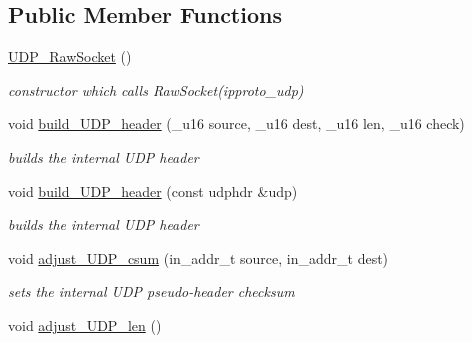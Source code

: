 \subsection*{Public Member Functions}
\begin{CompactItemize}
\item 
\hypertarget{classsocketpp_1_1UDP__RawSocket_508aba470eee4010ca16007823c91650}{
\hyperlink{classsocketpp_1_1UDP__RawSocket_508aba470eee4010ca16007823c91650}{UDP\_\-RawSocket} ()}
\label{classsocketpp_1_1UDP__RawSocket_508aba470eee4010ca16007823c91650}

\begin{CompactList}\small\item\em constructor which calls RawSocket(ipproto\_\-udp) \item\end{CompactList}\item 
void \hyperlink{classsocketpp_1_1UDP__RawSocket_f107901141295d21929008e281aac00f}{build\_\-UDP\_\-header} (\_\-u16 source, \_\-u16 dest, \_\-u16 len, \_\-u16 check)
\begin{CompactList}\small\item\em builds the internal UDP header \item\end{CompactList}\item 
void \hyperlink{classsocketpp_1_1UDP__RawSocket_b194e3ab2f5b758dee8a0c715d895c1e}{build\_\-UDP\_\-header} (const udphdr \&udp)
\begin{CompactList}\small\item\em builds the internal UDP header \item\end{CompactList}\item 
void \hyperlink{classsocketpp_1_1UDP__RawSocket_8d96a58ee9d39e2c014aa81ded23727a}{adjust\_\-UDP\_\-csum} (in\_\-addr\_\-t source, in\_\-addr\_\-t dest)
\begin{CompactList}\small\item\em sets the internal UDP pseudo-header checksum \item\end{CompactList}\item 
\hypertarget{classsocketpp_1_1UDP__RawSocket_1caa413cfe4f72d8c0aeccdcb10469b5}{
void \hyperlink{classsocketpp_1_1UDP__RawSocket_1caa413cfe4f72d8c0aeccdcb10469b5}{adjust\_\-UDP\_\-len} ()}
\label{classsocketpp_1_1UDP__RawSocket_1caa413cfe4f72d8c0aeccdcb10469b5}


\end{CompactItemize}
